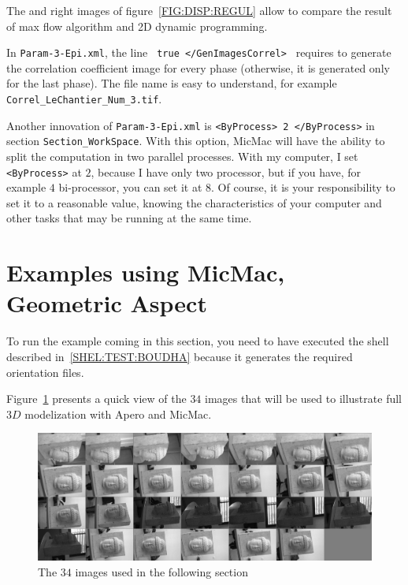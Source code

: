 The  %
 and right images of figure~\ref{FIG:DISP:REGUL}  allow to compare the result
of max flow algorithm and 2D dynamic programming.

In {\tt Param-3-Epi.xml}, the line {\tt  <GenImagesCorrel > true </GenImagesCorrel> }
requires to generate the correlation coefficient image for every phase
(otherwise, it is generated only for the last phase). The file name  is
easy to understand, for example  {\tt Correl\_LeChantier\_Num\_3.tif}.


Another innovation of {\tt Param-3-Epi.xml} is {\tt  <ByProcess> 2 </ByProcess>} in
section {\tt Section\_WorkSpace}. With this option, MicMac will have the ability
to split the computation in two parallel processes. With my computer, I set
{\tt  <ByProcess>} at $2$, because I have only two processor, but if you have,
for example $4$ bi-processor, you can set it at $8$. Of course, it is your responsibility
to set it to a reasonable value, knowing the characteristics of your computer
and other tasks that may be running at the same time.


\section{Examples using MicMac, Geometric Aspect}

To run the example coming in this section, you need to have executed the shell
described in~\ref{SHEL:TEST:BOUDHA}
because it generates the required orientation files.

Figure~\ref{FIG:ALL:BOUDHA} presents a quick view of the $34$
images that will be used to illustrate full $3D$ modelization
with Apero and MicMac.

\begin{figure}
\includegraphics[width=150mm]{FIGS/Boudhas/Planche.jpg}
\caption{The $34$ images used in the following section}
\label{FIG:ALL:BOUDHA}
\end{figure}

